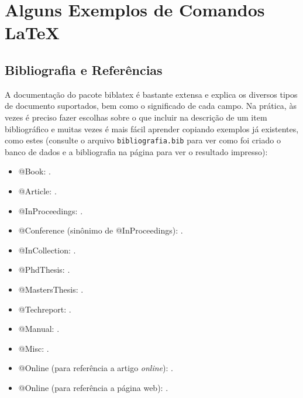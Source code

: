 \chapter{Alguns Exemplos de Comandos \LaTeX{}}
\label{chap:exemplos}

\section{Bibliografia e Referências}

A documentação do pacote biblatex é bastante extensa e explica
os diversos tipos de documento suportados, bem como o significado
de cada campo. Na prática, às vezes é preciso fazer escolhas sobre
o que incluir na descrição de um item bibliográfico e muitas vezes
é mais fácil aprender copiando exemplos já existentes, como estes (consulte o
arquivo \texttt{bibliografia.bib} para ver como foi criado o banco de dados e a
bibliografia na página \pageref{bibliografia} para ver o resultado impresso):

\begin{multicols}{2}
  \begin{itemize}
    \item @Book: \cite{JW82}.

    \item @Article: \cite{MenaChalco08}.

    \item @InProceedings: \cite{alves03:simi}.

    \item @Conference (sinônimo de @InProceedings): \cite{bronevetsky02}.

    \item @InCollection: \cite{bobaoglu93:concepts}.

    \item @PhdThesis: \cite{garcia01:PhD}.

    \item @MastersThesis: \cite{schmidt03:MSc}.

    \item @Techreport: \cite{alvisi99:analysisCIC}.

    \item @Manual: \cite{CORBA:spec}.

    \item @Misc: \cite{gridftp}.

    \item @Online (para referência a artigo \emph{online}): \cite{fowler04:designDead}.

    \item @Online (para referência a página web): \cite{FSF:GNU-GPL}.
  \end{itemize}
\end{multicols}

